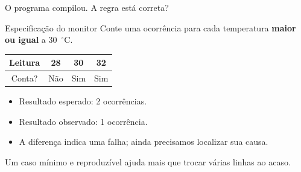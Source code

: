 \begin{frame}{O programa compilou. A regra está correta?}
\begin{block}{Especificação do monitor}
Conte uma ocorrência para cada temperatura \textbf{maior ou igual} a 30~$^{\circ}$C.
\end{block}
\begin{center}
\begin{tabular}{cccc}
\toprule
Leitura & 28 & 30 & 32 \\
\midrule
Conta? & Não & Sim & Sim \\
\bottomrule
\end{tabular}
\end{center}
\begin{itemize}
\item Resultado esperado: 2 ocorrências.
\item Resultado observado: 1 ocorrência.
\item A diferença indica uma falha; ainda precisamos localizar sua causa.
\end{itemize}
\small Um caso mínimo e reproduzível ajuda mais que trocar várias linhas ao acaso.
\end{frame}
